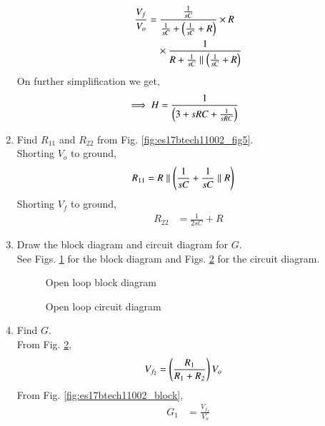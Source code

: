 \begin{enumerate}[label=\arabic*.,ref=\theenumi]
\begin{align}
\frac{V_{f}}{V_{o}} &=\frac{\frac{1}{sC}}{\frac{1}{sC} +  \left(\frac{1}{sC}+R\right)}\times R\\\
&\quad \times  \frac{1}{R + \frac{1}{sC} \parallel \left(\frac{1}{sC}+R\right)}
\end{align}
On further simplification we get,
\begin{align}
\implies H &= \frac{1}{\left(3+sRC +\frac{1}{sRC}\right)}
\label{eq:es17btech11002_H}
\end{align}
%
\item Find $R_{11}$ and $R_{22}$ from Fig. \ref{fig:es17btech11002_fig5}. 
\\
\solution Shorting  $V_{o}$ to ground,
\begin{align}
R_{11} &= R\parallel \left(\frac{1}{sC}+ \frac{1}{sC}\parallel R\right) 
\label{eq:es17btech11002_6}
\end{align}
Shorting $V_{f}$ to ground,
\begin{align}
R_{22} &= \frac{1}{2sC} + R  
\end{align}
%
\item Draw the block diagram and circuit diagram for $G$.\\
\solution See Figs. \ref{fig:es17btech11002_fig6} for the block diagram  and Figs. \ref{fig:es17btech11002_fig7} for the circuit diagram.
\numberwithin{figure}{enumi}
\renewcommand{\thefigure}{\theenumi.\arabic{figure}}
%
\begin{figure}[!ht]
	\begin{center}
		\resizebox{\columnwidth}{!}{}
	\end{center}
\caption{Open loop block diagram}
\label{fig:es17btech11002_fig6}
\end{figure}
%
\begin{figure}[!ht]
	\begin{center}
		\resizebox{\columnwidth}{!}{}
	\end{center}
\caption{Open loop circuit diagram}
\label{fig:es17btech11002_fig7}
\end{figure}
\renewcommand{\thefigure}{\theenumi}
%
\item Find $G$.
\\
\solution From Fig. \ref{fig:es17btech11002_fig7},
\begin{align}
V_{f_{2}} &= \left(\frac{R_{1}}{R_{1} + R_{2}}\right)V_{o}
\end{align}
From Fig. \ref{fig:es17btech11002_block},
%
\begin{align}
G_{1} &= \frac{V_{f_{2}}}{V_{o}}
\end{align}


\end{enumerate}
